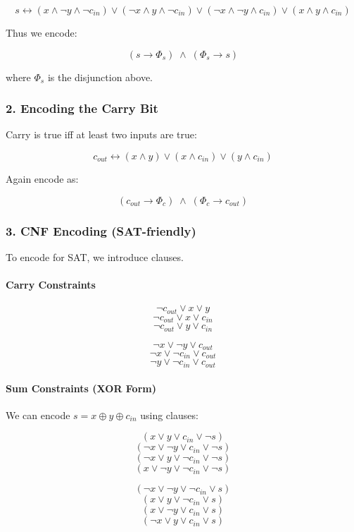\documentclass{article}
\begin{document}
\[
s \leftrightarrow
(x \land \neg y \land \neg c_{in})
\lor
(\neg x \land y \land \neg c_{in})
\lor
(\neg x \land \neg y \land c_{in})
\lor
(x \land y \land c_{in})
\]

Thus we encode:

\[
(s \rightarrow \Phi_s)
\;\land\;
(\Phi_s \rightarrow s)
\]

where $\Phi_s$ is the disjunction above.

\bigskip
\subsubsection*{2. Encoding the Carry Bit}

Carry is true iff at least two inputs are true:

\[
c_{out} \leftrightarrow
(x \land y)
\lor
(x \land c_{in})
\lor
(y \land c_{in})
\]

Again encode as:

\[
(c_{out} \rightarrow \Phi_c)
\;\land\;
(\Phi_c \rightarrow c_{out})
\]

\bigskip
\subsubsection*{3. CNF Encoding (SAT-friendly)}

To encode for SAT, we introduce clauses.

\paragraph{Carry Constraints}

\[
\neg c_{out} \lor x \lor y
\]
\[
\neg c_{out} \lor x \lor c_{in}
\]
\[
\neg c_{out} \lor y \lor c_{in}
\]

\[
\neg x \lor \neg y \lor c_{out}
\]
\[
\neg x \lor \neg c_{in} \lor c_{out}
\]
\[
\neg y \lor \neg c_{in} \lor c_{out}
\]

\bigskip
\paragraph{Sum Constraints (XOR Form)}

We can encode $s = x \oplus y \oplus c_{in}$ using clauses:

\[
(x \lor y \lor c_{in} \lor \neg s)
\]
\[
(\neg x \lor \neg y \lor c_{in} \lor \neg s)
\]
\[
(\neg x \lor y \lor \neg c_{in} \lor \neg s)
\]
\[
(x \lor \neg y \lor \neg c_{in} \lor \neg s)
\]

\[
(\neg x \lor \neg y \lor \neg c_{in} \lor s)
\]
\[
(x \lor y \lor \neg c_{in} \lor s)
\]
\[
(x \lor \neg y \lor c_{in} \lor s)
\]
\[
(\neg x \lor y \lor c_{in} \lor s)
\]
\end{document}
